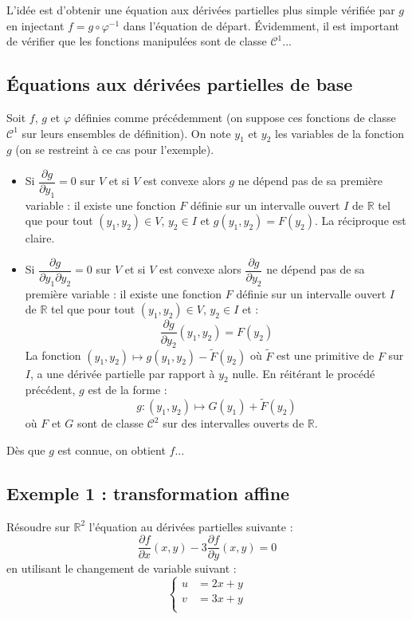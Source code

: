 \documentclass[french,11pt,twoside]{VcCours}
\begin{document}
\medskip

L'idée est d'obtenir une équation aux dérivées partielles plus simple vérifiée par $g$ en \og injectant \fg $f= g \circ \varphi^{-1}$ dans l'équation de départ. Évidemment, il est important de vérifier que les fonctions manipulées sont de classe $\mathcal{C}^1$...

\subsection{Équations aux dérivées partielles de base}
Soit $f$, $g$ et $\varphi$ définies comme précédemment (on suppose ces fonctions de classe $\mathcal{C}^1$ sur leurs ensembles de définition). On note $y_1$ et $y_2$ les variables de la fonction $g$ (on se restreint à ce cas pour l'exemple).

\begin{itemize}
\item Si $\dfrac{\partial g}{\partial y_1} =0$ sur $V$ et si $V$ est convexe alors $g$ ne dépend pas de sa première variable : il existe une fonction $F$ définie sur un intervalle ouvert $I$ de $\mathbb{R}$ tel que pour tout $(y_1,y_2) \in V$, $y_2 \in I$ et $g(y_1,y_2)=F(y_2)$. La réciproque est claire.
\item Si $\dfrac{\partial g}{\partial y_1 \partial y_2} =0$ sur $V$ et si $V$ est convexe alors $\dfrac{\partial g}{\partial y_2}$ ne dépend pas de sa première variable : il existe une fonction $F$ définie sur un intervalle ouvert $I$ de $\mathbb{R}$ tel que pour tout $(y_1,y_2) \in V$, $y_2 \in I$ et :
$$  \dfrac{\partial g}{\partial y_2}(y_1,y_2)=F(y_2)$$
La fonction $(y_1,y_2) \mapsto g(y_1,y_2) - \tilde{F}(y_2)$ où $\tilde{F}$ est une primitive de $F$ sur $I$, a une dérivée partielle par rapport à $y_2$ nulle. En réitérant le procédé précédent, $g$ est de la forme :
$$ g : (y_1,y_2) \mapsto G(y_1)+\tilde{F}(y_2)$$
où $F$ et $G$ sont de classe $\mathcal{C}^2$ sur des intervalles ouverts de $\mathbb{R}$.
\end{itemize}

\medskip

Dès que $g$ est connue, on obtient $f$...
\subsection{Exemple 1 : transformation affine}
Résoudre sur $\mathbb{R}^2$ l'équation au dérivées partielles suivante :
$$ \dfrac{\partial f}{\partial x}(x,y) - 3 \dfrac{\partial f}{\partial y}(x,y) = 0$$
en utilisant le changement de variable suivant :
$$ \left\lbrace \begin{array}{ccl}
u & = 2x+y \\
v& = 3x+y \\
\end{array}\right.$$
\end{document}
